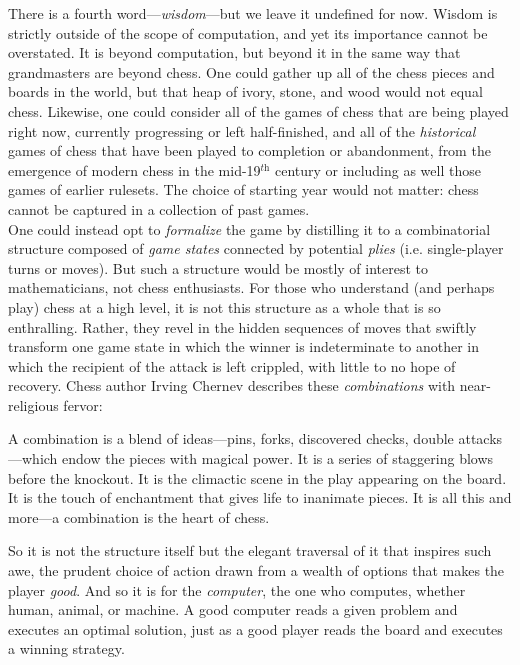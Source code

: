 There is a fourth word---\textit{wisdom}---but we leave it undefined for now. Wisdom is strictly outside of the scope of computation, and yet its importance cannot be overstated. It is beyond computation, but beyond it in the same way that grandmasters are beyond chess. One could gather up all of the chess pieces and boards in the world, but that heap of ivory, stone, and wood would not equal chess. Likewise, one could consider all of the games of chess that are being played right now, currently progressing or left half-finished, and all of the \textit{historical} games of chess that have been played to completion or abandonment, from the emergence of modern chess in the mid-19$^\textit{th}$ century or including as well those games of earlier rulesets. The choice of starting year would not matter: chess cannot be captured in a collection of past games. \\

One could instead opt to \textit{formalize} the game by distilling it to a combinatorial structure composed of \textit{game states} connected by potential \textit{plies} (i.e. single-player turns or moves). But such a structure would be mostly of interest to mathematicians, not chess enthusiasts. For those who understand (and perhaps play) chess at a high level, it is not this structure as a whole that is so enthralling. Rather, they revel in the hidden sequences of moves that swiftly transform one game state in which the winner is indeterminate to another in which the recipient of the attack is left crippled, with little to no hope of recovery. Chess author Irving Chernev describes these \textit{combinations} with near-religious fervor: \\

\begin{displayquote}
	A combination is a blend of ideas---pins, forks, discovered checks, double attacks---which endow the pieces with magical power. It is a series of staggering blows before the knockout. It is the climactic scene in the play appearing on the board. It is the touch of enchantment that gives life to inanimate pieces. It is all this and more---a combination is the heart of chess. \\
\end{displayquote}

So it is not the structure itself but the elegant traversal of it that inspires such awe, the prudent choice of action drawn from a wealth of options that makes the player \textit{good}. And so it is for the \textit{computer}, the one who computes, whether human, animal, or machine. A good computer reads a given problem and executes an optimal solution, just as a good player reads the board and executes a winning strategy. \\

